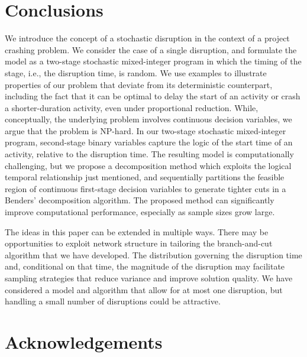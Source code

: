 \documentclass[11pt]{article}
\newcommand{\tcr}{\textcolor{red}}
\begin{document}
\section{Conclusions} \label{sec:conclusions}
	We introduce the concept of a stochastic disruption in the context of a project crashing problem. We consider the case of a single disruption, and formulate the model as a two-stage stochastic mixed-integer program in which the timing of the stage, i.e., the disruption time, is random.  We use examples to illustrate properties of our problem that deviate from its deterministic counterpart, including the fact that it can be optimal to delay the start of an activity or crash a shorter-duration activity, even under proportional reduction. While, conceptually, the underlying problem involves continuous decision variables, we argue that the problem is NP-hard. In our two-stage stochastic mixed-integer program, second-stage binary variables capture the logic of the start time of an activity, relative to the disruption time. The resulting model is computationally challenging, but we propose a decomposition method which exploits the logical temporal relationship just mentioned, and sequentially partitions the feasible region of continuous first-stage decision variables to generate tighter cuts in a Benders' decomposition algorithm. The proposed method can significantly improve computational performance, especially as sample sizes grow large.
	
 The ideas in this paper can be extended in multiple ways. There may be opportunities to exploit network structure in tailoring the branch-and-cut algorithm that we have developed. The distribution governing the disruption time and, conditional on that time, the magnitude of the disruption may facilitate sampling strategies that reduce variance and improve solution quality. We have considered a model and algorithm that allow for at most one disruption, but handling a small number of disruptions	could be attractive. 
	
	
\section*{Acknowledgements}
\end{document}
